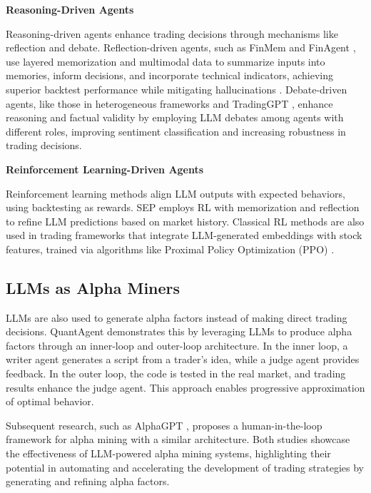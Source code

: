 \textbf{Reasoning-Driven Agents}

Reasoning-driven agents enhance trading decisions through mechanisms like reflection and debate. Reflection-driven agents, such as FinMem \citep{finmem} and FinAgent \citep{multimodalfinmem}, use layered memorization and multimodal data to summarize inputs into memories, inform decisions, and incorporate technical indicators, achieving superior backtest performance while mitigating hallucinations \citep{ji2023mitigatinghallucinationlargelanguage}. Debate-driven agents, like those in heterogeneous frameworks \citep{xing2024designingheterogeneousllmagents} and TradingGPT \citep{li2023tradinggptmultiagentlayeredmemory}, enhance reasoning and factual validity by employing LLM debates among agents with different roles, improving sentiment classification and increasing robustness in trading decisions.

\textbf{Reinforcement Learning-Driven Agents}

Reinforcement learning methods align LLM outputs with expected behaviors, using backtesting as rewards. SEP \citep{Koa_2024} employs RL with memorization and reflection to refine LLM predictions based on market history. Classical RL methods are also used in trading frameworks that integrate LLM-generated embeddings with stock features, trained via algorithms like Proximal Policy Optimization (PPO) \citep{ding2023integratingstockfeaturesglobal, ppo}.

\subsection{LLMs as Alpha Miners}

LLMs are also used to generate alpha factors instead of making direct trading decisions. QuantAgent \citep{wang2023alpha} demonstrates this by leveraging LLMs to produce alpha factors through an inner-loop and outer-loop architecture. In the inner loop, a writer agent generates a script from a trader's idea, while a judge agent provides feedback. In the outer loop, the code is tested in the real market, and trading results enhance the judge agent. This approach enables progressive approximation of optimal behavior.

Subsequent research, such as AlphaGPT \citep{wang2023alpha}, proposes a human-in-the-loop framework for alpha mining with a similar architecture. Both studies showcase the effectiveness of LLM-powered alpha mining systems, highlighting their potential in automating and accelerating the development of trading strategies by generating and refining alpha factors.
